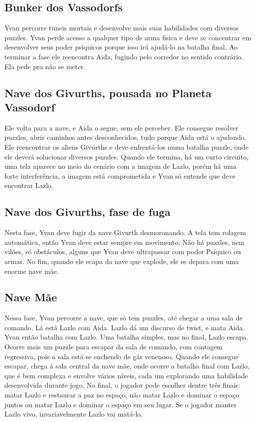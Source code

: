 \documentclass[12pt, a4paper]{article}
\begin{document}
	\subsection{Bunker dos Vassodorfs}

	Yvan percorre tuneis mortais e desenvolve mais suas habilidades 
    com diversos puzzles. Yvan perde acesso a qualquer tipo de arma 
    fisica e deve se concentrar em desenvolver seus poder psiquicos 
    porque isso irá ajudá-lo na batalha final. Ao terminar a fase 
    ele reencontra Aida, fugindo pelo corredor no sentido contrário. 
    Ela pede pra não se meter.

	\subsection{Nave dos Givurths, pousada no Planeta Vassodorf}
	
	Ele volta para a nave, e Aida o segue, sem ele perceber. Ele 
    consegue resolver puzzles, abrir caminhos antes desconhecidos, 
    tudo porque Aida está o ajudando. Ele reencontrar os aliens Givurths 
    e deve enfrentá-los numa batalha puzzle, onde ele deverá solucionar 
    diversos puzzles. Quando ele termina, há um curto circuito, uma tela 
    aparece no meio do cenário com a imagem de Lazlo, porém há uma forte 
    interferência, a imagem está comprometida e Yvan só entende que deve 
    encontrar Lazlo.

	\subsection{Nave dos Givurths, fase de fuga}

	Nesta fase, Yvan deve fugir da nave Givurth desmoronando. A tela 
    tem rolagem automática, então Yvan deve estar sempre em movimento. 
    Não há puzzles, nem vilões, só obstáculos, alguns que Yvan deve 
    ultrapassar com poder Psíquico ou armas. No fim, quando ele ecapa 
    da nave que explode, ele se depara com uma enorme nave mãe.

	\subsection{Nave Mãe}

	Nessa fase, Yvan percorre a nave, que só tem puzzles, até chegar 
    a uma sala de comando. Lá está Lazlo com Aida. Lazlo dá um discurso 
    de twist, e mata Aida. Yvan então batalha com Lazlo. Uma batalha 
    simples, mas no final, Lazlo escapa. 
	Ocorre mais um puzzle para escapar da sala de comando, com 
    contagem regressiva, pois a sala está se enchendo de gás venenoso.
    Quando ele consegue escapar, chega á sala central da nave mãe, 
    onde ocorre a batalha final com Lazlo, que é bem complexa e envolve 
    vários níveis, cada um explorando uma habilidade desenvolvida 
    durante jogo. No final, o jogador pode escolher dentre três finais: 
    matar Lazlo e restaurar a paz no espaço, não matar Lazlo e dominar 
    o espaço juntos ou matar Lazlo e dominar o espaço em seu lugar. Se 
    o jogador manter Lazlo vivo, invariavelmente Lazlo vai matá-lo.
\end{document}
